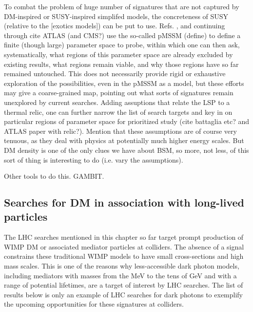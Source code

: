 To combat the problem of huge number of signatures that are not captured by DM-inspired or SUSY-inspired simplifed models, the concreteness of SUSY (relative to the [exotics models]) can be put to use. Refs. \cite{10.1140/epjc/s10052-011-1697-z}, and continuing through cite ATLAS (and CMS?) use the so-called pMSSM (define) to define a finite (though large) parameter space to probe, within which one can then ask, systematically, what regions of this parameter space are already excluded by existing results, what regions remain viable, and why those regions have so far remained untouched. This does not necessarily provide rigid or exhaustive exploration of the possibilities, even in the pMSSM as a model, but these efforts may give a coarse-grained map, pointing out what sorts of signatures remain unexplored by current searches. Adding assuptions that relate the LSP to a thermal relic, one can further narrow the list of search targets and key in on particular regions of parameter space for prioritized study (cite battaglia etc? and ATLAS paper with relic?). Mention that these assumptions are of course very tenuous, as they deal with physics at potentially much higher energy scales. But DM density is one of the only clues we have about BSM, so more, not less, of this sort of thing is interesting to do (i.e. vary the assumptions).

Other tools to do this. GAMBIT.

\subsection{Searches for DM in association with long-lived particles}
\label{sec:results_LLPSearches}



The LHC searches mentioned in this chapter so far target prompt production of WIMP DM or associated mediator particles at colliders. 
The absence of a signal constrains these traditional WIMP models to have small cross-sections and high mass scales. 
This is one of the reasons why less-accessible dark photon models, including mediators with masses from the MeV to the tens
of GeV and with a range of potential lifetimes, are a target of interest by LHC searches. The list of results
below is only an example of LHC searches for dark photons to exemplify the upcoming opportunities for these signatures at colliders. 

